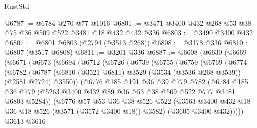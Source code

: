 \begin{lexlean}{RustStd}
\begin{coremodule}
@6787 := @6784 @270 @77 @1016
@6801 := @3471 @3400 @432 @268 @53 @38 @75 @36 @509 @522 @3481 @18 @432 @432 @336
@6803 := @3490 @3400 @432
@6807 := @6801 @6803 (@2794 (@3513 @268))
@6808 := @3178 @336
@6810 := @6807 (@3517 @6808)
@6811 := @3201 @336
@6887 := @6608
    (@6630
      (@6669
        (@6671
          (@6673
            (@6694
              (@6712
                (@6726
                  (@6739
                    (@6755
                      (@6759
                        (@6769
                          (@6774
                            (@6782
                              (@6787
                                (@6810
                                  (@3521 @6811)
                                  @3529
                                  (@3534 (@3536 @268 @3539))
                                  (@2581 @2724)
                                  @3550))
                              (@6776
                                @185
                                @191
                                @36
                                @39
                                @779
                                @782
                                (@6784
                                  @185
                                  @36
                                  @779
                                  (@5263
                                    @3400
                                    @432
                                    @89
                                    @36
                                    @53
                                    @38
                                    @509
                                    @522
                                    @777
                                    @3481
                                    @6803
                                    @5284))
                                (@6776
                                  @57
                                  @53
                                  @36
                                  @38
                                  @526
                                  @522
                                  (@3563
                                    @3400
                                    @432
                                    @18
                                    @36
                                    @18
                                    @526
                                    (@3571 (@3572 @3400 @18))
                                    @3582)
                                  (@3605 @3400 @432)))))
                          @3613
                          @3616

\end{coremodule}
\end{lexlean}
